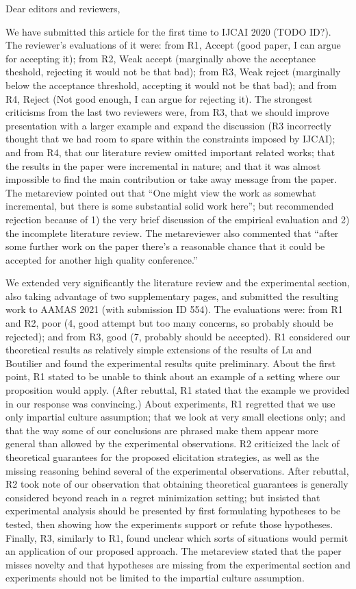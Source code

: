 \documentclass[version=3.21, pagesize, twoside=off, bibliography=totoc, DIV=calc, fontsize=12pt, a4paper]{scrartcl}
\begin{document}
Dear editors and reviewers,

We have submitted this article for the first time to IJCAI 2020 (TODO ID?). The reviewer’s evaluations of it were: from R1, Accept (good paper, I can argue for accepting it); from R2, Weak accept (marginally above the acceptance theshold, rejecting it would not be that bad); from R3, Weak reject (marginally below the acceptance threshold, accepting it would not be that bad); and from R4, Reject (Not good enough, I can argue for rejecting it). The strongest criticisms from the last two reviewers were, from R3, that we should improve presentation with a larger example and expand the discussion (R3 incorrectly thought that we had room to spare within the constraints imposed by IJCAI); and from R4, that our literature review omitted important related works; that the results in the paper were incremental in nature; and that it was almost impossible to find the main contribution or take away message from the paper. The metareview pointed out that “One might view the work as somewhat incremental, but there is some substantial solid work here”; but recommended rejection because of 1) the very brief discussion of the empirical evaluation and 2) the incomplete literature review. The metareviewer also commented that “after some further work on the paper there's a reasonable chance that it could be accepted for another high quality conference.”

We extended very significantly the literature review and the experimental section, also taking advantage of two supplementary pages, and submitted the resulting work to AAMAS 2021 (with submission ID 554). The evaluations were: from R1 and R2, poor (4, good attempt but too many concerns, so probably should be rejected); and from R3, good (7, probably should be accepted). R1 considered our theoretical results as relatively simple extensions of the results of Lu and Boutilier and found the experimental results quite preliminary. About the first point, R1 stated to be unable to think about an example of a setting where our proposition would apply. 
(After rebuttal, R1 stated that the example we provided in our response was convincing.) 
About experiments, R1 regretted that we use only impartial culture assumption; that we look at very small elections only; and that the way some of our conclusions are phrased make them appear more general than allowed by the experimental observations. 
R2 criticized the lack of theoretical guarantees for the proposed elicitation strategies, as well as the missing reasoning behind several of the experimental observations. After rebuttal, R2 took note of our observation that obtaining theoretical guarantees is generally considered beyond reach in a regret minimization setting; but insisted that experimental analysis should be presented by first formulating hypotheses to be tested, then showing how the experiments support or refute those hypotheses. Finally, R3, similarly to R1, found unclear which sorts of situations would permit an application of our proposed approach.
The metareview stated that the paper misses novelty and that hypotheses are missing from the experimental section and experiments should not be limited to the impartial culture assumption.
\end{document}
